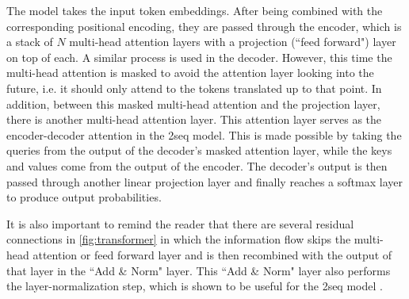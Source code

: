 The model takes the input token embeddings.
After being combined with the corresponding positional encoding, they are passed through the encoder, which is a stack of $N$ multi-head attention layers with a projection (``feed forward") layer on top of each.
A similar process is used in the decoder.
However, this time the multi-head attention is masked to avoid the attention layer looking into the future, i.e. it should only attend to the tokens translated up to that point.
In addition, between this masked multi-head attention and the projection layer, there is another multi-head attention layer. 
This attention layer serves as the encoder-decoder attention in the \seq2seq model.
This is made possible by taking the queries from the output of the decoder's masked attention layer, while the keys and values come from the output of the encoder.
The decoder's output is then passed through another linear projection layer and finally reaches a softmax layer to produce output probabilities.

It is also important to remind the reader that there are several residual connections in \cref{fig:transformer} in which the information flow skips the multi-head attention or feed forward layer and is then recombined with the output of that layer in the ``Add \& Norm" layer.
This ``Add \& Norm" layer also performs the layer-normalization step, which is shown to be useful for the \seq2seq model \citep{ba2016layer}.
